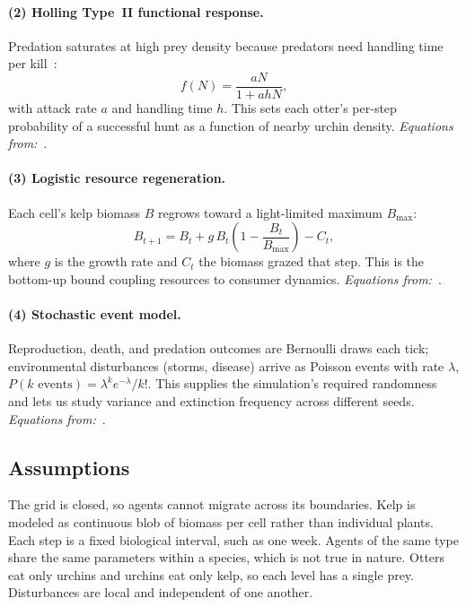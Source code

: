 \documentclass[manuscript,nonacm,11pt]{acmart}
\begin{document}
\paragraph{(2) Holling Type~II functional response.}
Predation saturates at high prey density because predators need handling time
per kill~\cite{holling1959}:
\begin{equation}
  f(N) = \frac{aN}{1 + a h N},
\end{equation}
with attack rate $a$ and handling time $h$. This sets each otter's per-step
probability of a successful hunt as a function of nearby urchin density.
\textit{Equations from:}~\cite{holling1959}.

\paragraph{(3) Logistic resource regeneration.}
Each cell's kelp biomass $B$ regrows toward a light-limited maximum
$B_{\max}$:
\begin{equation}
  B_{t+1} = B_t + g\,B_t\!\left(1 - \frac{B_t}{B_{\max}}\right) - C_t,
\end{equation}
where $g$ is the growth rate and $C_t$ the biomass grazed that step. This is the
bottom-up bound coupling resources to consumer dynamics.
\textit{Equations from:}~\cite{lotka1925}.

\paragraph{(4) Stochastic event model.}
Reproduction, death, and predation outcomes are Bernoulli draws each tick;
environmental disturbances (storms, disease) arrive as Poisson events with rate
$\lambda$, $P(k \text{ events}) = \lambda^k e^{-\lambda}/k!$. This supplies the
simulation's required randomness and lets us study variance and extinction
frequency across different seeds.
\textit{Equations from:}~\cite{railsback2019}.

\subsection{Assumptions}
The grid is closed, so agents cannot migrate across its boundaries. Kelp is
modeled as continuous blob of biomass per cell rather than individual plants. Each
step is a fixed biological interval, such as one week. Agents of the same type share the same
parameters within a species, which is not true in nature. Otters eat only urchins and urchins
eat only kelp, so each level has a single prey. Disturbances are local and
independent of one another.
\end{document}

